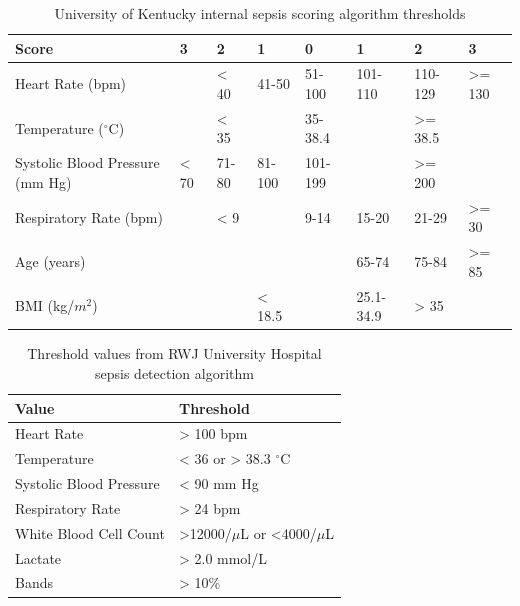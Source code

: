 \documentclass{sig-alternate}
\begin{document}
\begin{table}
\begin{center}
\renewcommand{\arraystretch}{1.5}
  \begin{tabular}{| l | l | l | l | l | l | l | l |}
\hline

{\bf Score} & {\bf 3} & {\bf 2} & {\bf 1} & {\bf 0} & {\bf 1} & {\bf 2} & {\bf 3}\\ \hline
Heart Rate (bpm) & & < 40 & 41-50 & 51-100 & 101-110 & 110-129 & >= 130\\ \hline
Temperature ($^\circ$C) & & < 35 & & 35-38.4 & & >= 38.5 &\\ \hline
Systolic Blood Pressure (mm Hg) & < 70 & 71-80 & 81-100 & 101-199 & & >= 200 & \\ \hline
Respiratory Rate (bpm) & & < 9 & & 9-14 & 15-20 & 21-29 & >= 30\\ \hline
Age (years) & & & & & 65-74 & 75-84 & >= 85\\ \hline
BMI (kg/$m^2$) & & & < 18.5 & & 25.1-34.9 & > 35 & \\ \hline

 \end{tabular}
	\caption{University of Kentucky internal sepsis scoring algorithm thresholds}
  \label{tab:uk_table}
\end{center}
\end{table}

\begin{table}
\renewcommand{\arraystretch}{1.5}
  \begin{tabular}{| l | l |}
\hline

{\bf Value} & {\bf Threshold}\\ \hline
Heart Rate & > 100 bpm\\ \hline
Temperature & < 36 or > 38.3 $^\circ$C\\ \hline
Systolic Blood Pressure & < 90 mm Hg\\ \hline
Respiratory Rate & > 24 bpm\\ \hline
White Blood Cell Count & >12000/$\mu$L  or <4000/$\mu$L\\ \hline
Lactate & > 2.0 mmol/L\\ \hline
Bands & > 10\% \\ \hline

 \end{tabular}
	\caption{Threshold values from RWJ University Hospital sepsis detection algorithm}
  \label{tab:rwj_table}
\end{table}
\end{document}
